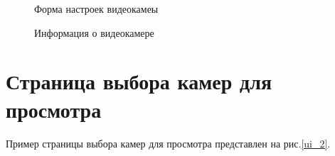 \newpage

\begin{figure}[!htb]
\def\svgwidth{\columnwidth}
\caption{Форма настроек видеокамеы}
\label{ui_4}
\end{figure}

\begin{figure}[!htb]
\def\svgwidth{\columnwidth}
\caption{Информация о видеокамере}
\label{ui_5}
\end{figure}

\newpage

\section{Страница выбора камер для просмотра}
Пример страницы выбора камер для просмотра представлен на рис.\ref{ui_2}.

